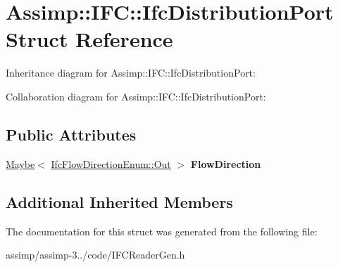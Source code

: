 \hypertarget{struct_assimp_1_1_i_f_c_1_1_ifc_distribution_port}{\section{Assimp\+:\+:I\+F\+C\+:\+:Ifc\+Distribution\+Port Struct Reference}
\label{struct_assimp_1_1_i_f_c_1_1_ifc_distribution_port}
}


Inheritance diagram for Assimp\+:\+:I\+F\+C\+:\+:Ifc\+Distribution\+Port\+:


Collaboration diagram for Assimp\+:\+:I\+F\+C\+:\+:Ifc\+Distribution\+Port\+:
\subsection*{Public Attributes}
\begin{DoxyCompactItemize}
\item 
\hypertarget{struct_assimp_1_1_i_f_c_1_1_ifc_distribution_port_aa41e6179b8de9318e1e9854b751b11d3}{\hyperlink{struct_assimp_1_1_s_t_e_p_1_1_maybe}{Maybe}$<$ \hyperlink{classboost_1_1shared__ptr}{Ifc\+Flow\+Direction\+Enum\+::\+Out} $>$ {\bfseries Flow\+Direction}}\label{struct_assimp_1_1_i_f_c_1_1_ifc_distribution_port_aa41e6179b8de9318e1e9854b751b11d3}

\end{DoxyCompactItemize}
\subsection*{Additional Inherited Members}


The documentation for this struct was generated from the following file\+:\begin{DoxyCompactItemize}
\item 
assimp/assimp-\/3../code/I\+F\+C\+Reader\+Gen.\+h\end{DoxyCompactItemize}
